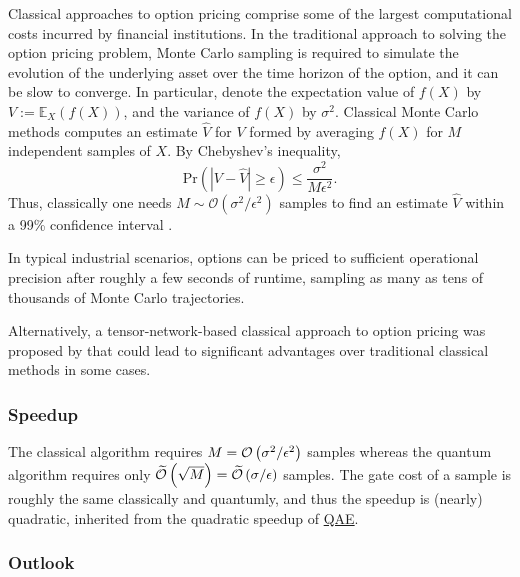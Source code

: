 \begin{refsection}
Classical approaches to option pricing comprise some of the largest computational costs incurred by financial institutions.
In the traditional approach to solving the option pricing problem, Monte Carlo sampling is required to simulate the evolution of the underlying asset over the time horizon of the option, and it can be slow to converge.
In particular, denote the expectation value of $f(X)$ by $V:=\mathbb{E}_{X}(f(X))$, and the variance of $f(X)$ by $\sigma^2$. Classical Monte Carlo methods computes an estimate $\hat{V}$ for $V$ formed by averaging $f(X)$ for $M$ independent samples of $X$. By Chebyshev's inequality,
\begin{equation*}
    \mathrm{Pr}(|V-\hat{V}|\geq \epsilon)\leq \frac{\sigma^2}{M\epsilon^2}.
\end{equation*}
Thus, classically one needs $M\sim\mathcal{O}(\sigma^2/\epsilon^2)$ samples to find an estimate $\hat{V}$ within a 99\% confidence interval \cite{montanaro2015QMonteCarlo}.

In typical industrial scenarios, options can be priced to sufficient operational precision after roughly a few seconds of runtime, sampling as many as tens of thousands of Monte Carlo trajectories.

Alternatively, a tensor-network-based classical approach to option pricing was proposed by \cite{kastoryano2022highly} that could lead to significant advantages over traditional classical methods in some cases. 


\subsubsection*{Speedup}
The classical algorithm requires $M = \mathcal{O}\left( \sigma^2/\epsilon^2 \right)$ samples whereas the quantum algorithm requires only $\widetilde{\mathcal{O}}\left( \sqrt{M} \right) = \widetilde{\mathcal{O}}\left( \sigma/\epsilon \right)$ samples. The gate cost of a sample is roughly the same classically and quantumly, and thus the speedup is (nearly) quadratic, inherited from the quadratic speedup of \hyperref[prim:AmpEst]{QAE}.


\subsubsection*{Outlook}


\end{refsection}
